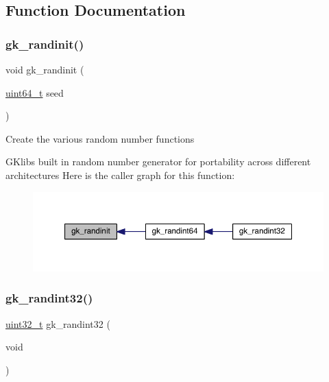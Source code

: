 \subsection{Function Documentation}
\mbox{\label{a00131_ae9493cf6b5b4bf33f152f2f37c87a3ac}} 
\subsubsection{\texorpdfstring{gk\+\_\+randinit()}{gk\_randinit()}}
{\footnotesize\ttfamily void gk\+\_\+randinit (\begin{DoxyParamCaption}\item[{\hyperlink{a00119_aec6fcb673ff035718c238c8c9d544c47}{uint64\+\_\+t}}]{seed }\end{DoxyParamCaption})}

Create the various random number functions

G\+Klib\textquotesingle{}s built in random number generator for portability across different architectures Here is the caller graph for this function\+:\nopagebreak
\begin{figure}[H]
\begin{center}
\leavevmode
\includegraphics[width=350pt]{a00131_ae9493cf6b5b4bf33f152f2f37c87a3ac_icgraph}
\end{center}
\end{figure}
\mbox{\label{a00131_a8e801d60d0dbdf0213d39cf210cddf11}} 
\subsubsection{\texorpdfstring{gk\+\_\+randint32()}{gk\_randint32()}}
{\footnotesize\ttfamily \hyperlink{a00119_a6eb1e68cc391dd753bc8ce896dbb8315}{uint32\+\_\+t} gk\+\_\+randint32 (\begin{DoxyParamCaption}\item[{void}]{ }\end{DoxyParamCaption})}

